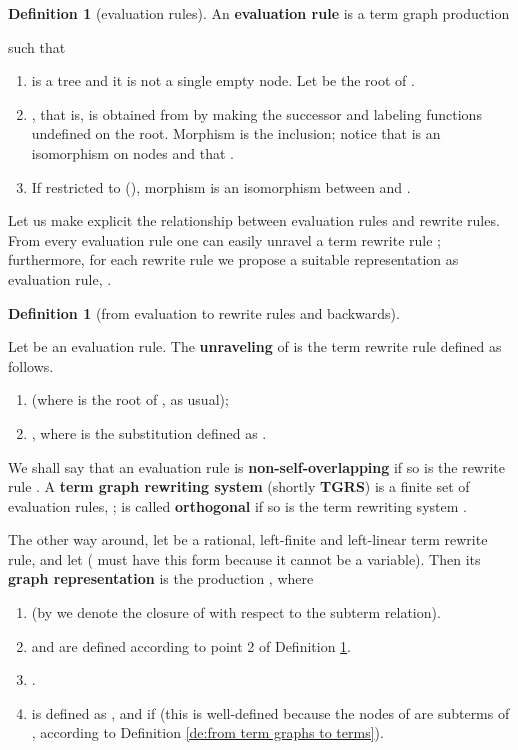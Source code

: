 \documentclass{eptcs}
\theoremstyle{plain}
\theoremstyle{definition}
\newtheorem{definition}[theorem]{Definition}
\begin{document}
\begin{definition}[evaluation rules]
\label{de:evaluation rules}
An {\bf evaluation rule\/} is a term graph production 
 
such that
\begin{enumerate}

\item   is a tree and it is not a single empty node. Let 
 be
the root of .

\item  , that is,  is 
obtained
from  by making the successor and labeling functions undefined on 
the root.
Morphism  is the inclusion; notice that  is an 
isomorphism on nodes and that .

\item  If restricted to  (), morphism  is an isomorphism between  
and . 
\end{enumerate}
\end{definition}


Let us make explicit the relationship between evaluation rules and 
rewrite rules. From every evaluation rule 
 one can easily unravel a term rewrite rule ; 
furthermore,
for each rewrite rule  we propose a suitable representation as 
evaluation rule, .

\begin{definition} 
[from evaluation to rewrite rules and backwards]
\label{de:evaluation to rewrite}

Let  be an evaluation rule. The {\bf 
unraveling} of  is the term rewrite rule  defined as 
follows.
\begin{enumerate}

\item
 (where  is the 
root of , as usual);

\item
, where  is the substitution defined as
.
\end{enumerate}

\noindent 
We shall say that an evaluation rule  is {\bf non-self-overlapping}
if so is the rewrite rule . A {\bf term graph rewriting 
system} (shortly {\bf TGRS})  is a finite set of evaluation 
rules, ;  is called {\bf 
orthogonal} if so is the term rewriting system . 

The other way around, let  be a rational,
left-finite and left-linear term rewrite rule, and let  ( must have this form because it cannot be a
variable). Then its {\bf graph representation}  is the
production , where

\begin{enumerate}
\item  (by  we denote 
the closure of  with respect to the subterm relation).

\item  and  are defined according to point 2 
of 
Definition \ref{de:evaluation rules}.

\item .

\item  is defined as , and 
 if  (this 
is 
well-defined because the nodes of  are subterms of , according to Definition \ref{de:from term graphs to 
terms}).
\end{enumerate}
\end{definition}
\end{document}
